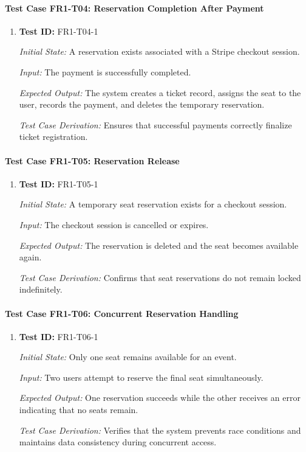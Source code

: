 \documentclass[12pt, titlepage]{article}
\begin{document}
\paragraph{Test Case FR1-T04: Reservation Completion After Payment}

\begin{enumerate}

\item \textbf{Test ID:} FR1-T04-1

\textit{Initial State:} A reservation exists associated with a Stripe checkout session.

\textit{Input:} The payment is successfully completed.

\textit{Expected Output:} The system creates a ticket record, assigns the seat to the user, records the payment, and deletes the temporary reservation.

\textit{Test Case Derivation:} Ensures that successful payments correctly finalize ticket registration.

\end{enumerate}


\paragraph{Test Case FR1-T05: Reservation Release}

\begin{enumerate}

\item \textbf{Test ID:} FR1-T05-1

\textit{Initial State:} A temporary seat reservation exists for a checkout session.

\textit{Input:} The checkout session is cancelled or expires.

\textit{Expected Output:} The reservation is deleted and the seat becomes available again.

\textit{Test Case Derivation:} Confirms that seat reservations do not remain locked indefinitely.

\end{enumerate}


\paragraph{Test Case FR1-T06: Concurrent Reservation Handling}

\begin{enumerate}

\item \textbf{Test ID:} FR1-T06-1

\textit{Initial State:} Only one seat remains available for an event.

\textit{Input:} Two users attempt to reserve the final seat simultaneously.

\textit{Expected Output:} One reservation succeeds while the other receives an error indicating that no seats remain.

\textit{Test Case Derivation:} Verifies that the system prevents race conditions and maintains data consistency during concurrent access.

\end{enumerate}
\end{document}
